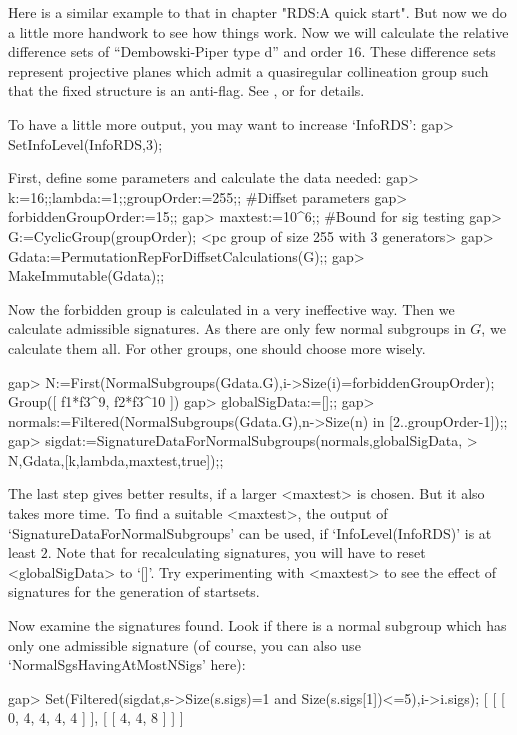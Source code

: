 
Here is a similar example to that in chapter "RDS:A quick start". But
now we do a little more handwork to see how things work.  Now we will
calculate the relative difference sets of ``Dembowski-Piper type d''
and order $16$. These difference sets represent projective planes
which admit a quasiregular collineation group such that the fixed
structure is an anti-flag. See \cite{DembowskiPiper}, \cite{Dembowski}
or \cite{RoederDiss} for details.

To have a little more output, you may want to increase `InfoRDS':
\begintt
gap> SetInfoLevel(InfoRDS,3);
\endtt

First, define some parameters and calculate the data needed:
\beginexample
gap> k:=16;;lambda:=1;;groupOrder:=255;; #Diffset parameters
gap> forbiddenGroupOrder:=15;;
gap> maxtest:=10^6;;                     #Bound for sig testing
gap> G:=CyclicGroup(groupOrder);
<pc group of size 255 with 3 generators>
gap> Gdata:=PermutationRepForDiffsetCalculations(G);;
gap> MakeImmutable(Gdata);; 
\endexample

Now the forbidden group is calculated in a very ineffective way. Then
we calculate admissible signatures. As there are only few normal
subgroups in $G$, we calculate them all. For other groups, one should
choose more wisely.

\beginexample
gap> N:=First(NormalSubgroups(Gdata.G),i->Size(i)=forbiddenGroupOrder);
Group([ f1*f3^9, f2*f3^10 ])
gap> globalSigData:=[];;
gap> normals:=Filtered(NormalSubgroups(Gdata.G),n->Size(n) in [2..groupOrder-1]);; 
gap> sigdat:=SignatureDataForNormalSubgroups(normals,globalSigData,
>                             N,Gdata,[k,lambda,maxtest,true]);;
\endexample

The last step gives better results, if a larger <maxtest> is chosen.
But it also takes more time. To find a suitable <maxtest>, the output
of `SignatureDataForNormalSubgroups' can be used, if
`InfoLevel(InfoRDS)' is at least $2$. Note that for recalculating
signatures, you will have to reset <globalSigData> to `[]'. Try experimenting
with <maxtest> to see the effect of signatures for the generation of
startsets.

Now examine the signatures found. Look if there is a normal subgroup
which has only one admissible signature (of course, you can also use
`NormalSgsHavingAtMostNSigs' here):

\beginexample
gap> Set(Filtered(sigdat,s->Size(s.sigs)=1 and Size(s.sigs[1])<=5),i->i.sigs);
[ [ [ 0, 4, 4, 4, 4 ] ], [ [ 4, 4, 8 ] ] ]
\endexample

